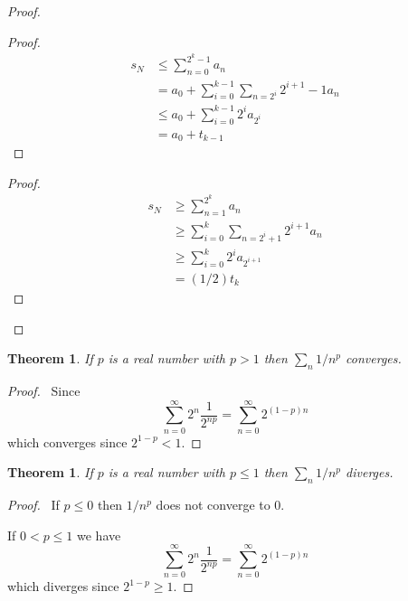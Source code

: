 \documentclass{book}
\let\qed\relax
\newtheorem{thm}[prop]{Theorem}
\theoremstyle{definition}
\begin{document}
\begin{proof}
\pf
{}
\begin{proof}
	\pf
	\begin{align*}
		s_N & \leq \sum_{n=0}^{2^k - 1} a_n \\
		& = a_0 + \sum_{i=0}^{k-1} \sum_{n=2^i}{2^{i+1} - 1} a_n \\
		& \leq a_0 + \sum_{i=0}^{k-1} 2^i a_{2^i} \\
		& = a_0 + t_{k-1}
	\end{align*}
\end{proof}
\begin{proof}
	\pf
	\begin{align*}
		s_N & \geq \sum_{n=1}^{2^k} a_n \\
		& \geq \sum_{i=0}^k \sum_{n = 2^i + 1}{2^{i+1}} a_n \\
		& \geq \sum_{i=0}^k 2^i a_{2^{i+1}} \\
		& = (1/2) t_k
	\end{align*}
\end{proof}
\qed
\end{proof}

\begin{thm}
If $p$ is a real number with $p > 1$ then $\sum_n 1/n^p$ converges.
\end{thm}

\begin{proof}
\pf\ Since
\[ \sum_{n=0}^\infty 2^n \frac{1}{2^{np}} = \sum_{n=0}^\infty 2^{(1-p)n} \]
which converges since $2^{1-p} < 1$. \qed
\end{proof}

\begin{thm}
If $p$ is a real number with $p \leq 1$ then $\sum_n 1/n^p$ diverges.
\end{thm}

\begin{proof}
\pf\ If $p \leq 0$ then $1/n^p$ does not converge to 0.

If $0 < p \leq 1$ we have
\[ \sum_{n=0}^\infty 2^n \frac{1}{2^{np}} = \sum_{n=0}^\infty 2^{(1-p)n} \]
which diverges since $2^{1-p} \geq 1$. \qed
\end{proof}
\end{document}
